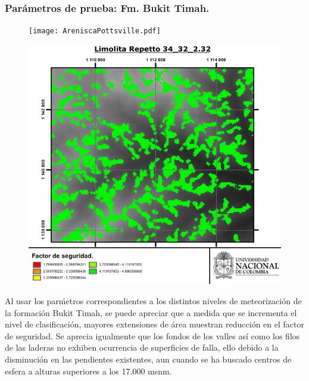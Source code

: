 \subsubsection{Par\'ametros de prueba: Fm. Bukit Timah.}
\begin{figure}[H]
\centering
\begin{minipage}{.45\linewidth}
  \texttt{[image: AreniscaPottsville.pdf]}
  \label{fig:pottsville}
\end{minipage}
\hspace{.05\linewidth}
\begin{minipage}{.45\linewidth}
  \includegraphics[width=\linewidth]{img/LimolitaRepetto34_32_232.pdf}
  \label{fig:repetto}
\end{minipage}
\end{figure}

Al usar los par\'metros correspondientes a los distintos niveles de meteorizaci\'on de la formaci\'on Bukit Timah, se puede apreciar que a medida que se incrementa el nivel de clasificaci\'on, mayores extensiones de \'area muestran reducci\'on en el factor de seguridad.
Se aprecia igualmente que los fondos de los valles as\'i como los filos de las laderas no exhiben ocurrencia de superficies de falla, ello debido a la disminuci\'on en las pendientes existentes, aun cuando se ha buscado centros de esfera a alturas superiores a los 17.000 msnm.


